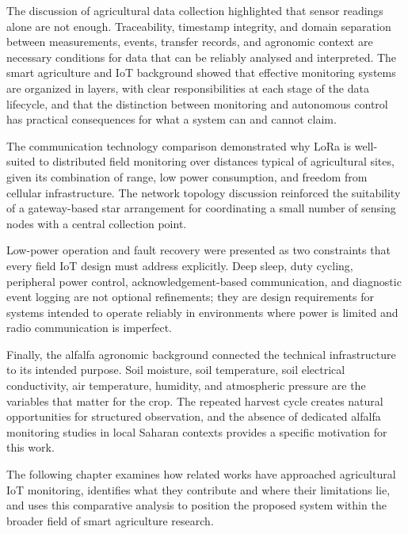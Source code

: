 The discussion of agricultural data collection highlighted that sensor readings
alone are not enough. Traceability, timestamp integrity, and domain separation
between measurements, events, transfer records, and agronomic context are
necessary conditions for data that can be reliably analysed and interpreted.
The smart agriculture and IoT background showed that effective monitoring systems
are organized in layers, with clear responsibilities at each stage of the data
lifecycle, and that the distinction between monitoring and autonomous control has
practical consequences for what a system can and cannot claim.

The communication technology comparison demonstrated why LoRa is well-suited to
distributed field monitoring over distances typical of agricultural sites, given
its combination of range, low power consumption, and freedom from cellular
infrastructure. The network topology discussion reinforced the suitability of
a gateway-based star arrangement for coordinating a small number of sensing nodes
with a central collection point.

Low-power operation and fault recovery were presented as two constraints that
every field IoT design must address explicitly. Deep sleep, duty cycling,
peripheral power control, acknowledgement-based communication, and diagnostic
event logging are not optional refinements; they are design requirements for
systems intended to operate reliably in environments where power is limited and
radio communication is imperfect.

Finally, the alfalfa agronomic background connected the technical infrastructure
to its intended purpose. Soil moisture, soil temperature, soil electrical
conductivity, air temperature, humidity, and atmospheric pressure are the
variables that matter for the crop. The repeated harvest cycle creates natural
opportunities for structured observation, and the absence of dedicated alfalfa
monitoring studies in local Saharan contexts provides a specific motivation for
this work.

The following chapter examines how related works have approached agricultural IoT
monitoring, identifies what they contribute and where their limitations lie, and
uses this comparative analysis to position the proposed system within the broader
field of smart agriculture research.
